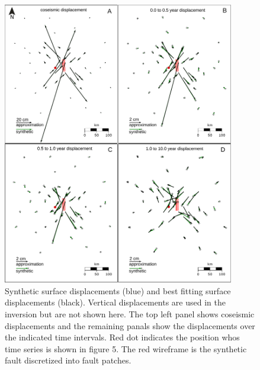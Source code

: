\documentclass[extra]{gji}
\begin{document}
\begin{figure}[h!]\label{figure4}
  \centering
  \includegraphics[width=0.9\textwidth]{FinalFigures/Figure4.pdf}
  \caption{Synthetic surface displacements (blue) and best fitting
    surface displacements (black).  Vertical displacements are used in
    the inversion but are not shown here.  The top left panel shows
    coseismic displacements and the remaining panals show the
    displacements over the indicated time intervals. Red dot indicates
    the position whos time series is shown in figure 5. The red wireframe
    is the synthetic fault discretized into fault patches.}
  \label{figure 4}
\end{figure}
\end{document}
